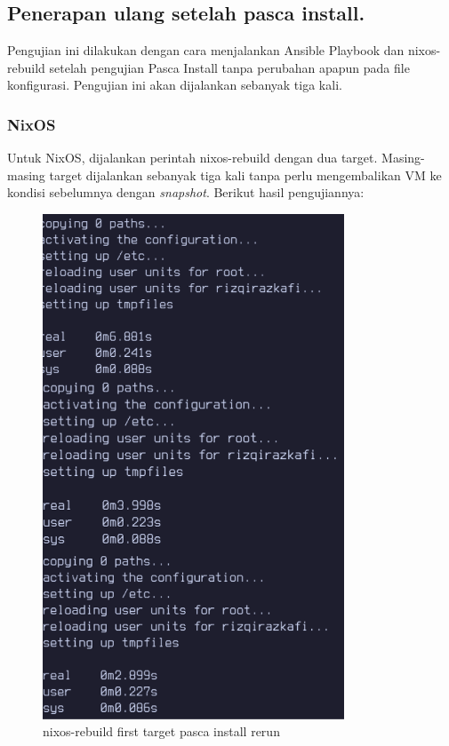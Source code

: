 \documentclass[10pt,]{report}
\begin{document}
\begin{adjustwidth}{20pt}{}
	\subsection{Penerapan ulang setelah pasca install.}
	\begin{adjustwidth}{20pt}{}
		Pengujian ini dilakukan dengan cara menjalankan Ansible Playbook dan nixos-rebuild
		setelah pengujian Pasca Install tanpa perubahan apapun pada file konfigurasi. Pengujian ini
		akan dijalankan sebanyak tiga kali.
	\end{adjustwidth}
	\subsubsection{NixOS}
	\begin{adjustwidth}{20pt}{}
		Untuk NixOS, dijalankan perintah nixos-rebuild dengan dua target. Masing-masing target
		dijalankan sebanyak tiga kali tanpa perlu mengembalikan VM ke kondisi sebelumnya dengan
		\textit{snapshot}. Berikut hasil pengujiannya:
		\begin{figure}[H]
			\begin{center}
				\includegraphics[width=0.8\textwidth]{images/nix-target/nix-rerun-25-com.png}
			\end{center}
			\caption{nixos-rebuild first target pasca install rerun}
		\end{figure}


\end{adjustwidth}
\end{adjustwidth}
\end{document}
